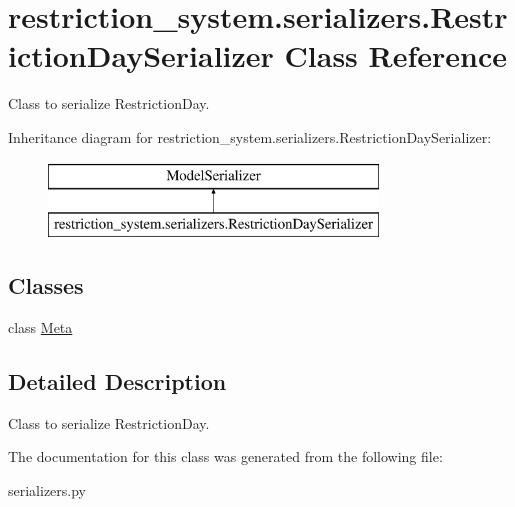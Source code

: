 \hypertarget{classrestriction__system_1_1serializers_1_1RestrictionDaySerializer}{}\section{restriction\+\_\+system.\+serializers.\+Restriction\+Day\+Serializer Class Reference}
\label{classrestriction__system_1_1serializers_1_1RestrictionDaySerializer}


Class to serialize Restriction\+Day.  


Inheritance diagram for restriction\+\_\+system.\+serializers.\+Restriction\+Day\+Serializer\+:\begin{figure}[H]
\begin{center}
\leavevmode
\includegraphics[height=2.000000cm]{classrestriction__system_1_1serializers_1_1RestrictionDaySerializer}
\end{center}
\end{figure}
\subsection*{Classes}
\begin{DoxyCompactItemize}
\item 
class \hyperlink{classrestriction__system_1_1serializers_1_1RestrictionDaySerializer_1_1Meta}{Meta}
\end{DoxyCompactItemize}


\subsection{Detailed Description}
Class to serialize Restriction\+Day. 

The documentation for this class was generated from the following file\+:\begin{DoxyCompactItemize}
\item 
serializers.\+py\end{DoxyCompactItemize}
